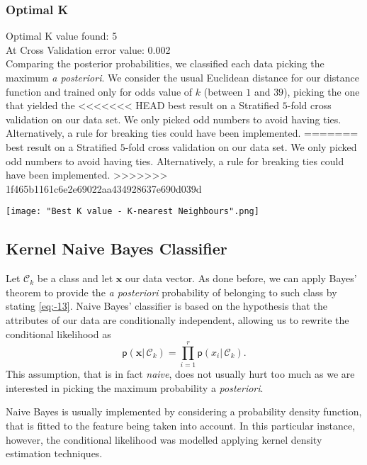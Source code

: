 \documentclass[a4paper]{article}
\begin{document}
\subsubsection{Optimal K}

Optimal K value found: 5\\
At Cross Validation error value: 0.002\\

Comparing the posterior probabilities, we classified each data picking
the maximum \textit{a posteriori}. We consider the usual Euclidean
distance for our distance function and trained only for odds value
of $k$ (between $1$ and $39$), picking the one that yielded the
<<<<<<< HEAD
best result on a Stratified $5$-fold cross validation on our data set.
We only picked odd numbers to avoid having ties.\\
Alternatively, a rule for breaking ties could have been implemented.
=======
best result on a Stratified $5$-fold cross validation on our data
set.
We only picked odd numbers to avoid having ties. Alternatively, a rule for breaking ties could have been implemented.
>>>>>>> 1f465b1161c6e2e69022aa434928637e690d039d

\texttt{[image: "Best K value - K-nearest Neighbours".png]}

\subsection{Kernel Naive Bayes Classifier}
Let $\mathcal{C}_{k}$ be a class and let $\mathbf{x}$ our data vector.
As done before, we can apply Bayes' theorem to provide the \textit{a
	posteriori} probability of belonging to such class by stating \ref{eq:-13}.
Naive Bayes' classifier is based on the hypothesis that the attributes
of our data are conditionally independent, allowing us to rewrite
the conditional likelihood as 
\begin{equation}
\mathsf{p}\left(\mathbf{x}|\,\mathcal{C}_{k}\right)=\prod_{i=1}^{r}\mathsf{p}\left(x_{i}|\,\mathcal{C}_{k}\right).\label{eq:-14}
\end{equation}
This assumption, that is in fact \textit{naive}, does not usually
hurt too much as we are interested in picking the maximum probability
a\textit{ posteriori}.

Naive Bayes is usually implemented by considering a probability density
function, that is fitted to the feature being taken into account.
In this particular instance, however, the conditional likelihood was
modelled applying kernel density estimation techniques.
\end{document}
